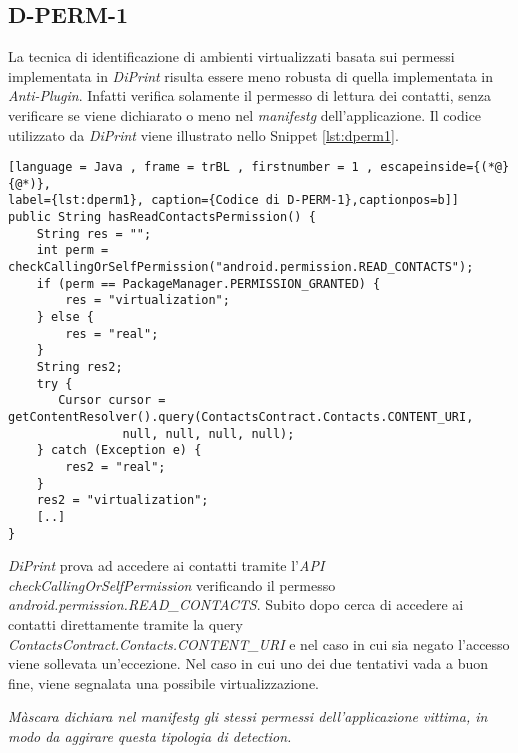 \newpage

\subsection*{D-PERM-1}
\label{d-perm-1}
La tecnica di identificazione di ambienti virtualizzati basata sui permessi implementata in \emph{DiPrint} risulta essere meno robusta di quella implementata in \emph{Anti-Plugin}. Infatti verifica solamente il permesso di lettura dei contatti, senza verificare se viene dichiarato o meno nel \emph{\gls{manifestg}} dell'applicazione. Il codice utilizzato da \emph{DiPrint} viene illustrato nello Snippet \ref{lst:dperm1}.

\begin{lstlisting}[language = Java , frame = trBL , firstnumber = 1 , escapeinside={(*@}{@*)},
label={lst:dperm1}, caption={Codice di D-PERM-1},captionpos=b]]
public String hasReadContactsPermission() {
    String res = "";
    int perm = checkCallingOrSelfPermission("android.permission.READ_CONTACTS");
    if (perm == PackageManager.PERMISSION_GRANTED) {
        res = "virtualization";
    } else {
        res = "real";
    }
    String res2;
    try {
       Cursor cursor = getContentResolver().query(ContactsContract.Contacts.CONTENT_URI,
                null, null, null, null);
    } catch (Exception e) {
        res2 = "real";
    }
    res2 = "virtualization";
    [..]
}
\end{lstlisting}

\emph{DiPrint} prova ad accedere ai contatti tramite l'\emph{API} \emph{checkCallingOrSelfPermission} verificando il permesso \emph{android.permission.READ\_CONTACTS}.
Subito dopo cerca di accedere ai contatti direttamente tramite la query \emph{ContactsContract.Contacts.CONTENT\_URI} e nel caso in cui sia negato l'accesso viene sollevata un'eccezione.
Nel caso in cui uno dei due tentativi vada a buon fine, viene segnalata una possibile virtualizzazione.

\emph{Màscara dichiara nel \gls{manifestg} gli stessi permessi dell'applicazione vittima, in modo da aggirare questa tipologia di detection.}


\newpage


